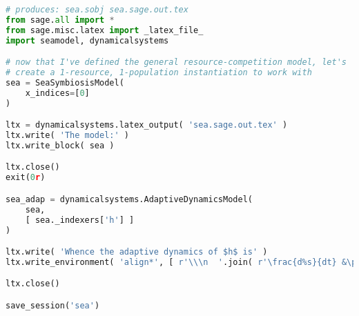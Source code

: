 \begin{lstlisting}[language=Python]
# produces: sea.sobj sea.sage.out.tex
from sage.all import * 
from sage.misc.latex import _latex_file_
import seamodel, dynamicalsystems

# now that I've defined the general resource-competition model, let's
# create a 1-resource, 1-population instantiation to work with
sea = SeaSymbiosisModel(
    x_indices=[0]
)

ltx = dynamicalsystems.latex_output( 'sea.sage.out.tex' )
ltx.write( 'The model:' )
ltx.write_block( sea )

ltx.close()
exit(0r)

sea_adap = dynamicalsystems.AdaptiveDynamicsModel( 
    sea,
    [ sea._indexers['h'] ]
)

ltx.write( 'Whence the adaptive dynamics of $h$ is' )
ltx.write_environment( 'align*', [ r'\\\n  '.join( r'\frac{d%s}{dt} &\propto %s' % (latex(v), latex(sea_adap._S[v])) for v in sea_adap._vars ) ] )

ltx.close()

save_session('sea')
\end{lstlisting}
